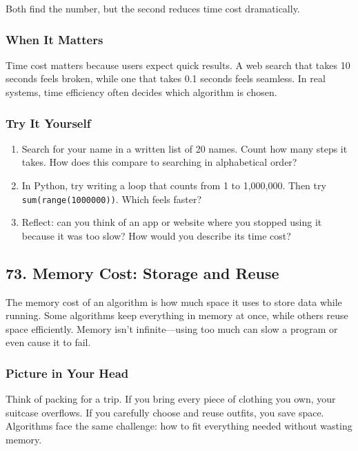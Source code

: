 \documentclass[
  letterpaper,
  DIV=11,
  numbers=noendperiod]{scrreprt}
\providecommand{\tightlist}{%
  \setlength{\itemsep}{0pt}\setlength{\parskip}{0pt}}
\begin{document}
Both find the number, but the second reduces time cost dramatically.

\subsubsection{When It Matters}\label{when-it-matters-70}

Time cost matters because users expect quick results. A web search that
takes 10 seconds feels broken, while one that takes 0.1 seconds feels
seamless. In real systems, time efficiency often decides which algorithm
is chosen.

\subsubsection{Try It Yourself}\label{try-it-yourself-72}

\begin{enumerate}
\def\labelenumi{\arabic{enumi}.}
\tightlist
\item
  Search for your name in a written list of 20 names. Count how many
  steps it takes. How does this compare to searching in alphabetical
  order?
\item
  In Python, try writing a loop that counts from 1 to 1,000,000. Then
  try \texttt{sum(range(1000000))}. Which feels faster?
\item
  Reflect: can you think of an app or website where you stopped using it
  because it was too slow? How would you describe its time cost?
\end{enumerate}

\subsection{73. Memory Cost: Storage and
Reuse}\label{memory-cost-storage-and-reuse}

The memory cost of an algorithm is how much space it uses to store data
while running. Some algorithms keep everything in memory at once, while
others reuse space efficiently. Memory isn't infinite---using too much
can slow a program or even cause it to fail.

\subsubsection{Picture in Your Head}\label{picture-in-your-head-73}

Think of packing for a trip. If you bring every piece of clothing you
own, your suitcase overflows. If you carefully choose and reuse outfits,
you save space. Algorithms face the same challenge: how to fit
everything needed without wasting memory.
\end{document}
